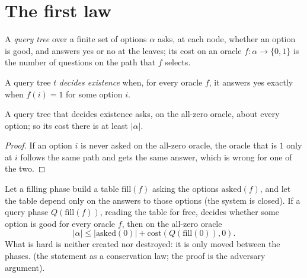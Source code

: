 \section{The first law}

A \emph{query tree} over a finite set of options $\alpha$ asks, at each node, whether an option is
good, and answers yes or no at the leaves; its cost on an oracle $f : \alpha \to \{0,1\}$ is the
number of questions on the path that $f$ selects.

\begin{definition}
  \label{def:querytree}
  \leanok
  A query tree $t$ \emph{decides existence} when, for every oracle $f$, it answers yes exactly when
  $f(i) = 1$ for some option $i$.
\end{definition}

\begin{lemma}
  \label{lem:adversary}
  \leanok
  A query tree that decides existence asks, on the all-zero oracle, about every option; so its cost
  there is at least $|\alpha|$.
\end{lemma}

\begin{proof}
  \leanok
  If an option $i$ is never asked on the all-zero oracle, the oracle that is $1$ only at $i$ follows
  the same path and gets the same answer, which is wrong for one of the two.
\end{proof}

\begin{theorem}
  \label{thm:conservation}
  \leanok
  Let a filling phase build a table $\mathrm{fill}(f)$ asking the options $\mathrm{asked}(f)$, and let
  the table depend only on the answers to those options (the system is closed). If a query phase
  $Q(\mathrm{fill}(f))$, reading the table for free, decides whether some option is good for every
  oracle $f$, then on the all-zero oracle
  \[
    |\alpha| \le |\mathrm{asked}(0)| + \mathrm{cost}(Q(\mathrm{fill}(0)), 0).
  \]
  What is hard is neither created nor destroyed: it is only moved between the phases.
  \own{} (the statement as a conservation law; the proof is the adversary argument).
\end{theorem}

